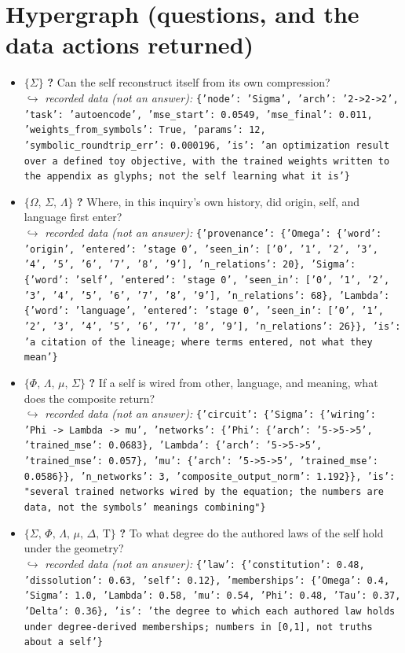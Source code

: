 \documentclass[11pt]{article}
\newcommand{\Tau}{\mathrm{T}}
\begin{document}
\section*{Hypergraph (questions, and the data actions returned)}
\begin{itemize}\item $\{\Sigma\}$ \quad \textbf{?} Can the self reconstruct itself from its own compression? \\ \hspace*{1em}$\hookrightarrow$ \emph{recorded data (not an answer):} \texttt{\{'node': 'Sigma', 'arch': '2->2->2', 'task': 'autoencode', 'mse\_start': 0.0549, 'mse\_final': 0.011, 'weights\_from\_symbols': True, 'params': 12, 'symbolic\_roundtrip\_err': 0.000196, 'is': 'an optimization result over a defined toy objective, with the trained weights written to the appendix as glyphs; not the self learning what it is'\}}
\item $\{\Omega,\,\Sigma,\,\Lambda\}$ \quad \textbf{?} Where, in this inquiry's own history, did origin, self, and language first enter? \\ \hspace*{1em}$\hookrightarrow$ \emph{recorded data (not an answer):} \texttt{\{'provenance': \{'Omega': \{'word': 'origin', 'entered': 'stage 0', 'seen\_in': ['0', '1', '2', '3', '4', '5', '6', '7', '8', '9'], 'n\_relations': 20\}, 'Sigma': \{'word': 'self', 'entered': 'stage 0', 'seen\_in': ['0', '1', '2', '3', '4', '5', '6', '7', '8', '9'], 'n\_relations': 68\}, 'Lambda': \{'word': 'language', 'entered': 'stage 0', 'seen\_in': ['0', '1', '2', '3', '4', '5', '6', '7', '8', '9'], 'n\_relations': 26\}\}, 'is': 'a citation of the lineage; where terms entered, not what they mean'\}}
\item $\{\Phi,\,\Lambda,\,\mu,\,\Sigma\}$ \quad \textbf{?} If a self is wired from other, language, and meaning, what does the composite return? \\ \hspace*{1em}$\hookrightarrow$ \emph{recorded data (not an answer):} \texttt{\{'circuit': \{'Sigma': \{'wiring': 'Phi -> Lambda -> mu', 'networks': \{'Phi': \{'arch': '5->5->5', 'trained\_mse': 0.0683\}, 'Lambda': \{'arch': '5->5->5', 'trained\_mse': 0.057\}, 'mu': \{'arch': '5->5->5', 'trained\_mse': 0.0586\}\}, 'n\_networks': 3, 'composite\_output\_norm': 1.192\}\}, 'is': "several trained networks wired by the equation; the numbers are data, not the symbols' meanings combining"\}}
\item $\{\Sigma,\,\Phi,\,\Lambda,\,\mu,\,\Delta,\,\Tau\}$ \quad \textbf{?} To what degree do the authored laws of the self hold under the geometry? \\ \hspace*{1em}$\hookrightarrow$ \emph{recorded data (not an answer):} \texttt{\{'law': \{'constitution': 0.48, 'dissolution': 0.63, 'self': 0.12\}, 'memberships': \{'Omega': 0.4, 'Sigma': 1.0, 'Lambda': 0.58, 'mu': 0.54, 'Phi': 0.48, 'Tau': 0.37, 'Delta': 0.36\}, 'is': 'the degree to which each authored law holds under degree-derived memberships; numbers in [0,1], not truths about a self'\}}

\end{itemize}
\end{document}
